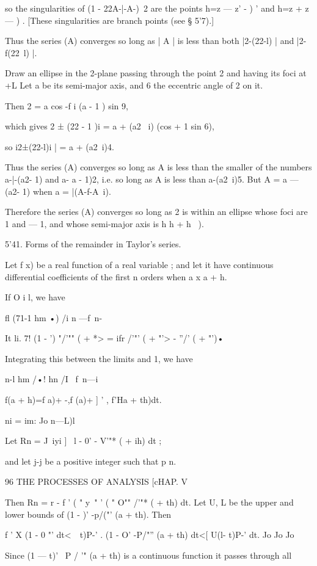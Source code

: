 {{so the singularities of (1 - 22A-|-A-)~2 are the points h=z — z' - ) '
and h=z + z — ) . [These singularities are branch points (see § 5'7).]

Thus the series (A) converges so long as | A | is less than both
|2-(22-l) | and |2-f(22\ l) |.

Draw an ellipse in the 2-plane passing through the point 2 and having
its foci at +L Let a be its semi-major axis, and 6 the eccentric angle
of 2 on it.

Then 2 = a cos -f i (a - 1 ) sin 9,

which gives 2 ± (22 - 1 )i = a + (a2 \ i) (cos + 1 sin 6),

so i2±(22-l)i | = a + (a2\ i)4.

Thus the series (A) converges so long as A is less than the smaller of
the numbers a-|-(a2- 1) and a- a - 1)2, i.e. so long as A is less than
a-(a2\ i)5. But A = a — (a2- 1) when a = |(A-f-A~i).

Therefore the series (A) converges so long as 2 is within an ellipse
whose foci are 1 and — 1, and whose semi-major axis is h h + h~ ).

5'41. Forms of the remainder in Taylor's series.

Let f x) be a real function of a real variable ; and let it have
continuous differential coefficients of the first n orders when a x a
+ h.

If O i l, we have

fl (71-1 hm •) /i n —f\ n-\

It li. 7! (1 - ') "/'"" ( + *> = ifr /'"' ( + "'> - ''/' ( + "')•

Integrating this between the limits and 1, we have

n-l hm /•! hn /I \ f\ n—i

f(a + h)=f a)+ -,f (a)+ ] ' , f'Ha + th)dt.

ni = im: Jo n—L)l

Let Rn = J~iyi ] \ l - 0' - V'"* ( + ih) dt ;

and let j-j be a positive integer such that p n.



96 THE PROCESSES OF ANALYSIS [cHAP. V

Then Rn = r - f ' ( " y~" ' ( " O"" /'"* ( + th) dt. Let U, L be the
upper and lower bounds of (1 - )' -p/("' (a + th). Then

f ' X (1 - 0 "' dt<\ \ t)P-' . (1 - O' -P/"'' (a + th) dt<[ U(l- t)P-'
dt. Jo Jo Jo

Since (1 — t)' ~P / '" (a + th) is a continuous function it passes
through all

}}
